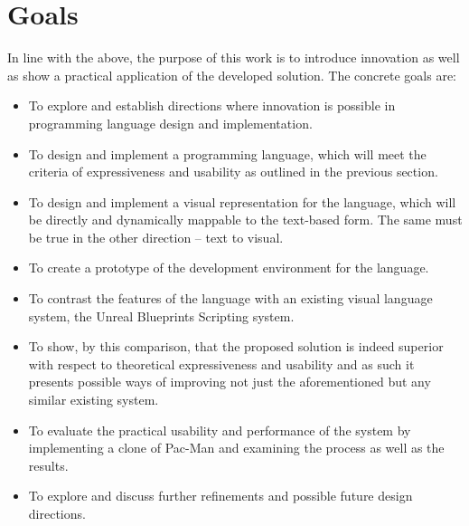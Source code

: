\section{Goals}
In line with the above, the purpose of this work is to introduce innovation as well as show a practical application of the developed solution. The concrete goals are:
\begin{itemize}
	\item To explore and establish directions where innovation is possible in programming language design and implementation.
	\item To design and implement a programming language, which will meet  the criteria of expressiveness and usability as outlined in the previous section.
    \item To design and implement a visual representation for the language, which will be directly and dynamically mappable to the text-based form. The same must be true in the other direction -- text to visual.
	\item To create a prototype of the development environment for the language.
    \item To contrast the features of the language with an existing visual language system, the Unreal Blueprints Scripting system.
    \item To show, by this comparison, that the proposed solution is indeed superior with respect to theoretical expressiveness and usability and as such it presents possible ways of improving not just the aforementioned but any similar existing system.
	\item To evaluate the practical usability and performance of the system by implementing a clone of Pac-Man and examining the process as well as the results.
	\item To explore and discuss further refinements and possible future design directions.
\end{itemize}

